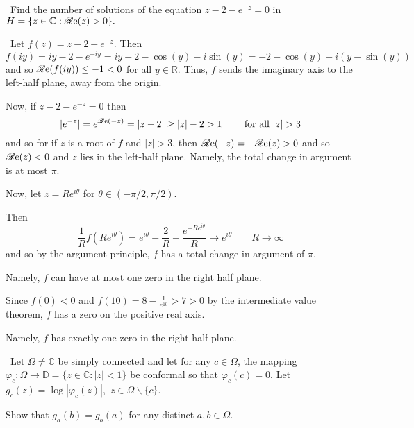 \documentclass[12pt]{Qual}
\begin{document}
\begin{problem} $\,$
Find the number of solutions of the equation $z-2-e^{-z}=0$ in $H=\{z\in\mathbb{C}:\mathscr{R}\text{e}(z)>0\}.$
\end{problem}

\begin{solution}$\,$
Let $f(z)=z-2-e^{-z}$. Then $$f(iy)=iy-2-e^{-iy}=iy-2-\cos(y)-i\sin(y)=-2-\cos(y)+i(y-\sin(y))$$ and so $\mathscr{R}\text{e}(f(iy))\le -1<0$ for all $y\in\mathbb{R}$. Thus, $f$ sends the imaginary axis to the left-half plane, away from the origin.

Now, if $z-2-e^{-z}=0$ then $$|e^{-z}|=e^{\re(-z)}=|z-2|\ge|z|-2>1\qquad\text{ for all }|z|>3$$ and so for if $z$ is a root of $f$ and $|z|>3$, then $\mathscr{R}\text{e}(-z)=-\mathscr{R}\text{e}(z)>0$ and so $\mathscr{R}\text{e}(z)<0$ and $z$ lies in the left-half plane. Namely, the total change in argument is at most $\pi.$

Now, let $z=Re^{i\theta}$ for $\theta\in(-\pi/2,\pi/2).$

Then $$\frac{1}{R}f(Re^{i\theta})=e^{i\theta}-\frac{2}{R}-\frac{e^{-Re^{i\theta}}}{R}\to e^{i\theta}\qquad R\to\infty$$ and so by the argument principle, $f$ has a total change in argument of $\pi$.

Namely, $f$ can have at most one zero in the right half plane.

Since $f(0)<0$ and $f(10)=8-\frac{1}{e^{10}}>7>0$ by the intermediate value theorem, $f$ has a zero on the positive real axis.

Namely, $f$ has exactly one zero in the right-half plane.

\end{solution}
\newpage




\begin{problem} $\,$
Let $\Omega\not=\mathbb{C}$ be simply connected and let for any $c\in\Omega$, the mapping $\varphi_c:\Omega\to\mathbb{D}=\{z\in\mathbb{C}:|z|<1\}$ be conformal so that $\varphi_c(c)=0.$ Let $g_c(z)=\log|\varphi_c(z)|,$ $z\in\Omega\backslash\{c\}.$

Show that $g_a(b)=g_b(a)$ for any distinct $a,b\in\Omega.$
\end{problem}
\end{document}
